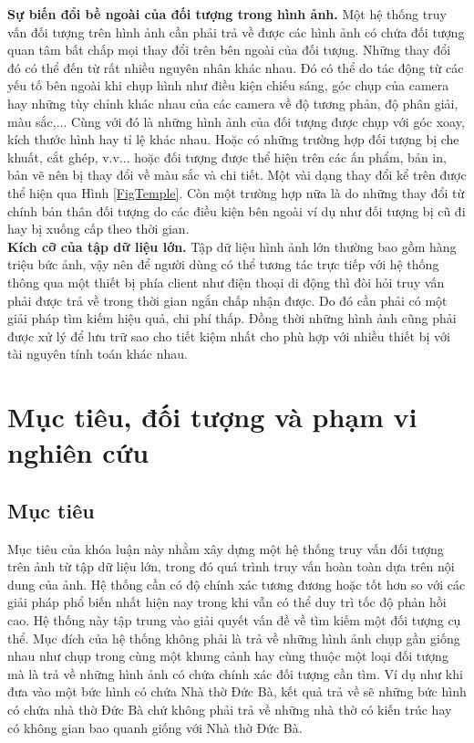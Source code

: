 \textbf{Sự biến đổi bề ngoài của đối tượng trong hình ảnh.} Một hệ thống truy vấn đối tượng trên hình ảnh cần phải trả về được các hình ảnh có chứa đối tượng quan tâm bất chấp mọi thay đổi trên bên ngoài của đối tượng. Những thay đổi đó có thể đến từ rất nhiều nguyên nhân khác nhau. Đó có thể do tác động từ các yếu tố bên ngoài khi chụp hình như điều kiện chiếu sáng, góc chụp của camera hay những tùy chỉnh khác nhau của các camera về độ tương phản, độ phân giải, màu sắc,... Cùng với đó là những hình ảnh của đối tượng được chụp với góc xoay, kích thước hình hay tỉ lệ khác nhau. Hoặc có những trường hợp đối tượng bị che khuất, cắt ghép, v.v... hoặc đối tượng được thể hiện trên các ấn phẩm, bản in, bản vẽ nên bị thay đổi về màu sắc và chi tiết. Một vài dạng thay đổi kể trên được thể hiện qua Hình \ref{FigTemple}. Còn một trường hợp nữa là do những thay đổi từ chính bản thân đối tượng do các điều kiện bên ngoài ví dụ như đối tượng bị cũ đi hay bị xuống cấp theo thời gian.\\
 \textbf{Kích cỡ của tập dữ liệu lớn.} Tập dữ liệu hình ảnh lớn thường bao gồm hàng triệu bức ảnh, vậy nên để người dùng có thể tương tác trực tiếp với hệ thống thông qua một thiết bị phía client như điện thoại di động thì đòi hỏi truy vấn phải được trả về trong thời gian ngắn chấp nhận được. Do đó cần phải có một giải pháp tìm kiếm hiệu quả, chi phí thấp. Đồng thời những hình ảnh cũng phải được xử lý để lưu trữ sao cho tiết kiệm nhất cho phù hợp với nhiều thiết bị với tài nguyên tính toán khác nhau.\\
 
\section{Mục tiêu, đối tượng và phạm vi nghiên cứu}
\subsection{Mục tiêu}
Mục tiêu của khóa luận này nhằm xây dựng một hệ thống truy vấn đối tượng trên ảnh từ tập dữ liệu lớn, trong đó quá trình truy vấn hoàn toàn dựa trên nội dung của ảnh. Hệ thống cần có độ chính xác tương đương hoặc tốt hơn so với các giải pháp phổ biến nhất hiện nay trong khi vẫn có thể duy trì tốc độ phản hồi cao. Hệ thống này tập trung vào giải quyết vấn đề về tìm kiếm một đối tượng cụ thể. Mục đích của hệ thống không phải là trả về những hình ảnh chụp gần giống nhau như chụp trong cùng một khung cảnh hay cùng thuộc một loại đối tượng mà là trả về những hình ảnh có chứa chính xác đối tượng cần tìm. Ví dụ như khi đưa vào một bức hình có chứa Nhà thờ Đức Bà, kết quả trả về sẽ những bức hình có chứa nhà thờ Đức Bà chứ không phải trả về những nhà thờ có kiến trúc hay có không gian bao quanh giống với Nhà thờ Đức Bà.

